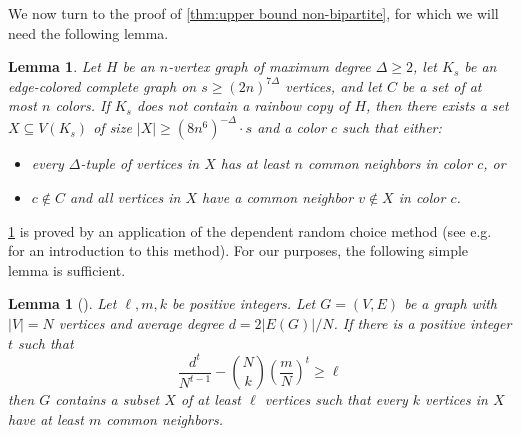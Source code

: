\documentclass[a4paper,11pt]{article}
\newtheorem{lemma}[theorem]{\bf Lemma}
\theoremstyle{definition}
\begin{document}
We now turn to the proof of \cref{thm:upper bound non-bipartite}, for which we will need the following lemma.

\begin{lemma}\label{lemma:one_step}
Let $H$ be an $n$-vertex graph of maximum degree $\Delta\geq 2$, let $K_s$ be an edge-colored complete graph on $s\geq (2n)^{7\Delta}$ vertices, and let $C$ be a set of at most $n$ colors. If $K_s$ does not contain a rainbow copy of $H$, then there exists a set $X\subseteq V(K_s)$ of size 
$|X|\geq (8n^6)^{-\Delta} \cdot s$ and a color $c$ such that either:
\begin{itemize}
    \item every $\Delta$-tuple of vertices in $X$ has at least $n$ common neighbors in color $c$, or
    \item $c\notin C$ and all vertices in $X$ have a common neighbor $v\notin X$ in color $c$.
\end{itemize}
\end{lemma}

\cref{lemma:one_step} is proved by an application of the dependent random choice method (see e.g.\ \cite{FS11} for an introduction to this method). For our purposes, the following simple lemma is sufficient.

\begin{lemma}[{\cite[Lemma 2.1]{FS11}}]\label{lemma:dep_rand_choice}
Let $\ell, m, k$ be positive integers. Let $G = (V, E)$ be a graph with $|V| = N$ vertices and average degree $d = 2|E(G)|/N$. If there is a positive integer $t$ such that
$$\frac{d^{t}}{N^{t-1}}-\binom{N}{k}\left(\frac{m}{N}\right)^{t}\geq \ell$$
then $G$ contains a subset $X$ of at least $\ell$ vertices such that every $k$ vertices in $X$ have at least $m$ common neighbors.
\end{lemma}
\end{document}
